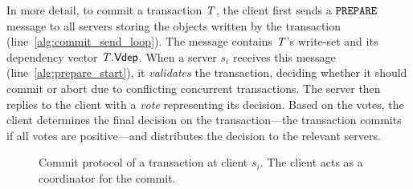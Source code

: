 In more detail, to commit a transaction $\mathit{T}$, the client first sends a ${\tt PREPARE}$ message to all servers storing the objects written by the transaction (line~\ref{alg:commit_send_loop}). The message contains $\mathit{T}$'s write-set and its dependency vector $\mathit{T}.\mathsf{Vdep}$. When a server $s_i$ receives this message (line~\ref{alg:prepare_start}), it \emph{validates} the transaction, deciding whether it should commit or abort due to conflicting concurrent transactions. The server then replies to the client with a \emph{vote} representing its decision. Based on the votes, the client determines the final decision on the transaction---the transaction commits if all votes are positive---and distributes the decision to the relevant servers.

\begin{figure}[h]
\begin{algorithm}[H]

\end{algorithm}
\caption{Commit protocol of a transaction at client $s_i$. The client acts as a coordinator for the commit.}
\end{figure}

